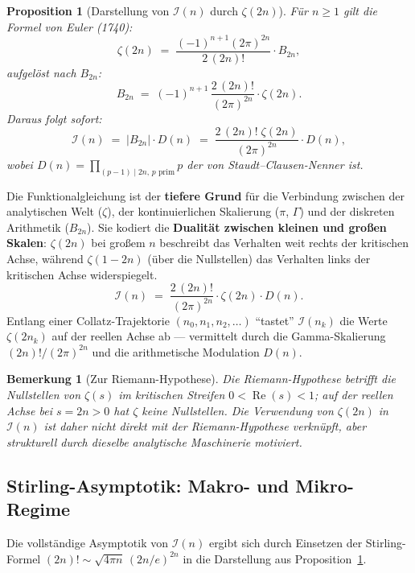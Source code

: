 \documentclass[12pt,a4paper]{article}
\newtheorem{proposition}[definition]{Proposition}
\newtheorem{bemerkung}[definition]{Bemerkung}
\newcommand{\abs}[1]{\lvert#1\rvert}
\newcommand{\In}{\mathcal{I}}      %
\newcommand{\Denom}[1]{D(#1)}     %
\begin{document}
\begin{proposition}[Darstellung von $\In(n)$ durch $\zeta(2n)$]
\label{prop:zeta-verbindung}
Für $n \geq 1$ gilt die Formel von Euler (1740):
\[
  \zeta(2n) \;=\; \frac{(-1)^{n+1}(2\pi)^{2n}}{2\,(2n)!} \cdot B_{2n},
\]
aufgelöst nach $B_{2n}$:
\[
  B_{2n} \;=\; (-1)^{n+1}\,\frac{2\,(2n)!}{(2\pi)^{2n}} \cdot \zeta(2n).
\]
Daraus folgt sofort:
\[
  \In(n) \;=\; \abs{B_{2n}} \cdot \Denom{n}
         \;=\; \frac{2\,(2n)!\;\zeta(2n)}{(2\pi)^{2n}} \cdot \Denom{n},
\]
wobei $\Denom{n} = \prod_{(p-1)\mid 2n,\, p \text{ prim}} p$ der von Staudt--Clausen-Nenner ist.
\end{proposition}

\begin{tcolorbox}[bernoulli, title={Verbindung zur Riemann-Zeta-Funktion}]
Die Funktionalgleichung ist der \textbf{tiefere Grund} für die Verbindung zwischen
der analytischen Welt ($\zeta$), der kontinuierlichen Skalierung ($\pi$, $\Gamma$)
und der diskreten Arithmetik ($B_{2n}$). Sie kodiert die
\textbf{Dualität zwischen kleinen und großen Skalen}: $\zeta(2n)$ bei großem
$n$ beschreibt das Verhalten weit rechts der kritischen Achse, während
$\zeta(1-2n)$ (über die Nullstellen) das Verhalten links der kritischen Achse widerspiegelt.
\[
  \boxed{\In(n) \;=\; \frac{2\,(2n)!}{\,(2\pi)^{2n}} \cdot \zeta(2n) \cdot \Denom{n}.}
\]
Entlang einer Collatz-Trajektorie $(n_0, n_1, n_2, \ldots)$ ``tastet'' $\In(n_k)$
die Werte $\zeta(2n_k)$ auf der reellen Achse ab --- vermittelt durch die
Gamma-Skalierung $(2n)!/(2\pi)^{2n}$ und die arithmetische Modulation $\Denom{n}$.
\end{tcolorbox}

\begin{bemerkung}[Zur Riemann-Hypothese]
Die Riemann-Hypothese betrifft die Nullstellen von $\zeta(s)$ im kritischen Streifen
$0 < \operatorname{Re}(s) < 1$; auf der reellen Achse bei $s = 2n > 0$ hat $\zeta$
keine Nullstellen. Die Verwendung von $\zeta(2n)$ in $\In(n)$ ist daher \emph{nicht}
direkt mit der Riemann-Hypothese verknüpft, aber strukturell durch dieselbe analytische
Maschinerie motiviert.
\end{bemerkung}

\subsection{Stirling-Asymptotik: Makro- und Mikro-Regime}
\label{subsec:stirling}

Die vollständige Asymptotik von $\In(n)$ ergibt sich durch Einsetzen der
Stirling-Formel $(2n)! \sim \sqrt{4\pi n}\,(2n/e)^{2n}$ in die Darstellung aus
Proposition~\ref{prop:zeta-verbindung}.
\end{document}
